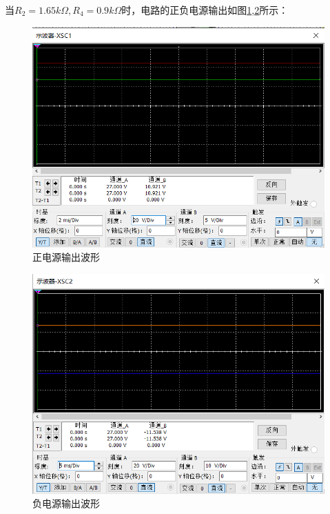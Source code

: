 \documentclass{article}
\begin{document}
\begin{spacing}{1.5}
    当$R_2 = 1.65 k\Omega , R_4 = 0.9k \Omega$时，电路的正负电源输出如图\ref{fig:sim2_result1},\ref{fig:sim2_result2}所示：

    \begin{figure}[H]
        \centering
        \includegraphics[scale=0.4]{fig/sim/sim2_result1.png}
        \caption{正电源输出波形}
        \label{fig:sim2_result1}
    \end{figure}
    
    \begin{figure}[H]
        \centering
        \includegraphics[scale=0.4]{fig/sim/sim2_result2.png}
        \caption{负电源输出波形}
        \label{fig:sim2_result2}
    \end{figure}
    

\end{spacing}
\end{document}
